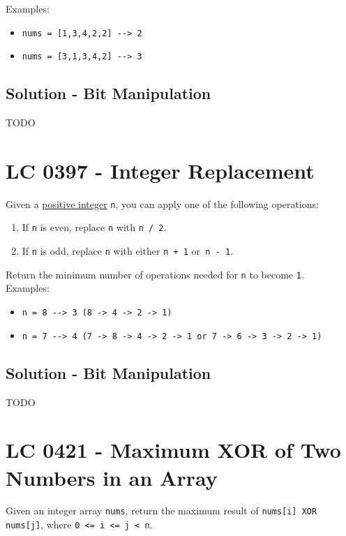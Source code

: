 Examples:
\begin{itemize}
\item {\colorbox{CodeBackground}{\lstinline|nums = [1,3,4,2,2] --> 2|}}
\item {\colorbox{CodeBackground}{\lstinline|nums = [3,1,3,4,2] --> 3|}}
\end{itemize}

\subsection*{Solution - Bit Manipulation}
TODO

\section{LC 0397 - Integer Replacement}
Given a \ul{positive integer} {\colorbox{CodeBackground}{\lstinline|n|}}, you can apply one of the following operations:
\begin{enumerate}
\item If {\colorbox{CodeBackground}{\lstinline|n|}} is even, replace {\colorbox{CodeBackground}{\lstinline|n|}} with {\colorbox{CodeBackground}{\lstinline|n / 2|}}.
\item If {\colorbox{CodeBackground}{\lstinline|n|}} is odd, replace {\colorbox{CodeBackground}{\lstinline|n|}} with either {\colorbox{CodeBackground}{\lstinline|n + 1|}} or{\colorbox{CodeBackground}{\lstinline| n - 1|}}.
\end{enumerate}
Return the minimum number of operations needed for {\colorbox{CodeBackground}{\lstinline|n|}} to become {\colorbox{CodeBackground}{\lstinline|1|}}.\\

Examples:
\begin{itemize}
\item {\colorbox{CodeBackground}{\lstinline|n = 8 --> 3 (8 -> 4 -> 2 -> 1)|}}
\item {\colorbox{CodeBackground}{\lstinline|n = 7 --> 4 (7 -> 8 -> 4 -> 2 -> 1 or 7 -> 6 -> 3 -> 2 -> 1)|}}
\end{itemize}

\subsection*{Solution - Bit Manipulation}
TODO

\section{LC 0421 - Maximum XOR of Two Numbers in an Array}
Given an integer array {\colorbox{CodeBackground}{\lstinline|nums|}}, return the maximum result of {\colorbox{CodeBackground}{\lstinline|nums[i] XOR nums[j]|}}, where {\colorbox{CodeBackground}{\lstinline|0 <= i <= j < n|}}.\\

